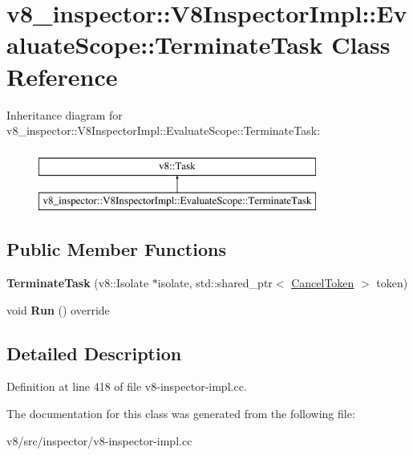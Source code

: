 \hypertarget{classv8__inspector_1_1V8InspectorImpl_1_1EvaluateScope_1_1TerminateTask}{}\section{v8\+\_\+inspector\+:\+:V8\+Inspector\+Impl\+:\+:Evaluate\+Scope\+:\+:Terminate\+Task Class Reference}
\label{classv8__inspector_1_1V8InspectorImpl_1_1EvaluateScope_1_1TerminateTask}
Inheritance diagram for v8\+\_\+inspector\+:\+:V8\+Inspector\+Impl\+:\+:Evaluate\+Scope\+:\+:Terminate\+Task\+:\begin{figure}[H]
\begin{center}
\leavevmode
\includegraphics[height=2.000000cm]{classv8__inspector_1_1V8InspectorImpl_1_1EvaluateScope_1_1TerminateTask}
\end{center}
\end{figure}
\subsection*{Public Member Functions}
\begin{DoxyCompactItemize}
\item 
\mbox{\label{classv8__inspector_1_1V8InspectorImpl_1_1EvaluateScope_1_1TerminateTask_ac9fcd49560c62af5df076f831791e6ed}} 
{\bfseries Terminate\+Task} (v8\+::\+Isolate $\ast$isolate, std\+::shared\+\_\+ptr$<$ \mbox{\hyperlink{structv8__inspector_1_1V8InspectorImpl_1_1EvaluateScope_1_1CancelToken}{Cancel\+Token}} $>$ token)
\item 
\mbox{\label{classv8__inspector_1_1V8InspectorImpl_1_1EvaluateScope_1_1TerminateTask_af3f2e14153f7b7ab3012cd555c7bceea}} 
void {\bfseries Run} () override
\end{DoxyCompactItemize}


\subsection{Detailed Description}


Definition at line 418 of file v8-\/inspector-\/impl.\+cc.



The documentation for this class was generated from the following file\+:\begin{DoxyCompactItemize}
\item 
v8/src/inspector/v8-\/inspector-\/impl.\+cc\end{DoxyCompactItemize}
